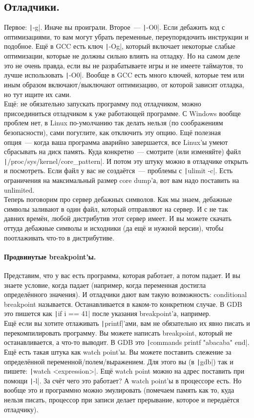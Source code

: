 \documentclass{article}
\begin{document}
    \subsection{Отладчики.}
    Первое: \texttt|-g|. Иначе вы проиграли. Второе~--- \texttt|-O0|. Если дебажить код с оптимизациями, то вам могут убрать переменные, переупорядочить инструкции и подобное. Ещё в GCC есть ключ \texttt|-Og|, который включает некоторые слабые оптимизации, которые не должны сильно влиять на отладку. Но на самом деле это не очень правда, если вы не разрабатываете игры и не имеете таймаутов, то лучше использовать \texttt|-O0|. Вообще в GCC есть много ключей, которые тем или иным образом включают/выключают оптимизацию, от которой зависит отладка, но тут ищите их сами.\\
    Ещё: не обязательно запускать программу под отладчиком, можно присоединиться отладчиком к уже работающей программе. С Windows вообще проблем нет, в Linux по-умолчанию так делать нельзя (по соображениям безопасности), сами погуглите, как отключить эту опцию. Ещё полезная опция~--- когда ваша программа аварийно завершается, все Linux'ы умеют сбрасывать на диск память. Куда конкретно~--- смотрите (или изменяйте) файл \texttt|/proc/sys/kernel/core_pattern|. И потом эту штуку можно в отладчике открыть и посмотреть. Если файл у вас не создаётся~--- проблемы с \texttt|ulimit -c|. Есть ограничения на максимальный размер core dump'а, вот вам надо поставить на unlimited.\\
    Теперь поговорим про сервер дебажных символов. Как мы знаем, дебажные символы заливают в один файл, который отправляют на сервер. И с не так давних времён, любой дистрибутив этот сервер имеет. И вы можете скачать оттуда дебажные символы и исходники (да ещё и нужной версии), чтобы поотлаживать что-то в дистрибутиве.
    \paragraph{Продвинутые breakpoint'ы.}
    Представим, что у вас есть программа, которая работает, а потом падает. И вы знаете условие, когда падает (например, когда переменная достигла определённого значения). И отладчики дают вам такую возможность: conditional breakpoint называется. Останавливается в каком-то конкретном случае. В GDB это пишется как \texttt|if i == 41| после указания breakpoint'а, например.\\
    Ещё если вы хотите отлаживать \texttt|printf|'ами, вам не обязательно их явно писать и перекомпилировать программу. Вы можете написать breakpoint, который не останавливается, а что-то выводит. В GDB это \texttt|commands printf "abacaba" end|.\\
    Ещё есть такая штука как watch point'ы. Вы можете поставить слежение за определённой переменной/полем/выражением. Для этого вы (в \texttt|gdb|) так и пишете: \texttt|watch <expression>|. Ещё watch point можно на адрес поставить при помощи \texttt|-l|. За счёт чего это работает? А watch point'ы в процессоре есть. Но вообще это и программно можно эмулировать (помечаем память как то, куда нельзя писать, процессор при записи делает прерывание, которое и передаётся отладчику).
\end{document}
